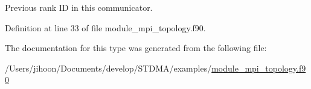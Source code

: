 Previous rank ID in this communicator. 



Definition at line 33 of file module\+\_\+mpi\+\_\+topology.\+f90.



The documentation for this type was generated from the following file\+:\begin{DoxyCompactItemize}
\item 
/\+Users/jihoon/\+Documents/develop/\+S\+T\+D\+M\+A/examples/\mbox{\hyperlink{module__mpi__topology_8f90}{module\+\_\+mpi\+\_\+topology.\+f90}}\end{DoxyCompactItemize}
